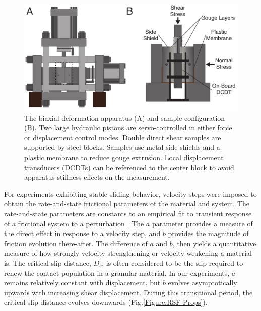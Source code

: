 \documentclass[11pt]{article}
\begin{document}
\begin{figure}
    \centering
    \includegraphics[scale=0.5]{../Figures/Fig_Biax_Schematic/biax_schematic.pdf}
       \caption{The biaxial deformation apparatus (A) and sample configuration (B).
       Two large hydraulic pistons are servo-controlled in either force or
       displacement control modes. Double direct shear samples are supported by
       steel blocks. Samples use metal side shields and a plastic membrane to
       reduce gouge extrusion.  Local displacement transducers (DCDTs) can be
       referenced to the center block to avoid apparatus stiffness effects on
       the measurement.}
      \label{Fig:Biax Schematic}
\end{figure}

For experiments exhibiting stable sliding behavior, velocity steps were imposed
to obtain the rate-and-state frictional parameters of the material and system.
The rate-and-state parameters are constants to an empirical fit to transient
response of a frictional system to a perturbation \cite{Marone:1998,Dieterich:1979,Ruina:1983}. The $a$
parameter provides a measure of the direct effect in response to a velocity
step, and $b$ provides the magnitude of friction evolution there-after. The
difference of $a$ and $b$, then yields a quantitative measure of how strongly
velocity strengthening or velocity weakening a material is. The critical slip
distance, $D_c$, is often considered to be the slip required to renew the
contact population in a granular material. In our experiments, $a$ remains
relatively constant with displacement, but $b$ evolves asymptotically upwards
with increasing shear displacement. During this transitional period, the
critical slip distance evolves downwards (Fig.\ref{Figure:RSF Props}).
\end{document}

